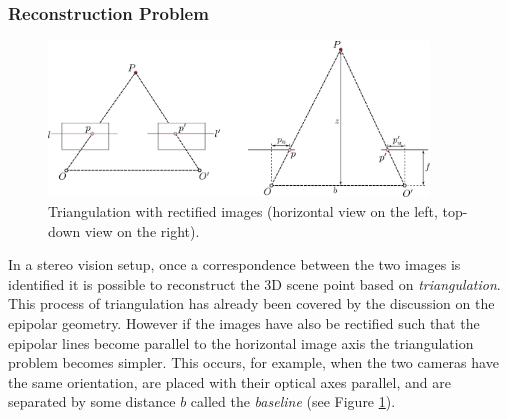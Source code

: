 \subsubsection{Reconstruction Problem}

\begin{figure}[ht]
\centering
\includegraphics[width=0.9\textwidth]{tex/figs/ch10_figs/triangulation.png}
\caption{Triangulation with rectified images (horizontal view on the left, top-down view on the right).}
\label{fig:recttri}
\end{figure}
In a stereo vision setup, once a correspondence between the two images is identified it is possible to reconstruct the 3D scene point based on \textit{triangulation}. This process of triangulation has already been covered by the discussion on the epipolar geometry. However if the images have also be rectified such that the epipolar lines become parallel to the horizontal image axis the triangulation problem becomes simpler. This occurs, for example, when the two cameras have the same orientation, are placed with their optical axes parallel, and are separated by some distance $b$ called the \textit{baseline} (see Figure \ref{fig:recttri}).

